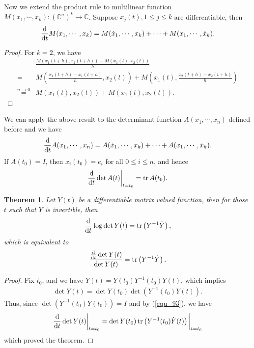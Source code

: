 \documentclass[10pt]{book}
\newtheorem{theorem}{Theorem}[chapter]
\theoremstyle{definition}
\numberwithin{equation}{chapter}
\begin{document}
Now we extend the product rule to multilinear function $M(x_1,\cdots, x_k): \left(\mathbb{C}^n\right)^k \to \mathbb{C}$. Suppose $x_j(t), 1\leq j \leq k$ are differentiable, then 
\begin{align}
    \dv{}{t}M(x_1,\cdots, x_k) = M(\dot{x}_1,\cdots, x_k) + \cdots + M(x_1,\cdots, \dot{x}_k).
\end{align}
\begin{proof}
For $k=2$, we have
\begin{align*}
    & \frac{M(x_1(t+h), x_2(t+h)) - M(x_1(t), x_2(t))}{h} \\
    = & M\left(\frac{x_1(t+h)-x_1(t+h)}{h}, x_2(t)\right) + M\left(x_1(t),\frac{x_2(t+h)-x_2(t+h)}{h} \right) \\
    \overset{n\to 0}{=} & M(\dot{x}_1(t), x_2(t)) + M(x_1(t), \dot{x}_2(t)).
\end{align*}
\end{proof}

We can apply the above result to the determinant function $A(x_1,\cdots,x_n)$ defined before and we have
\begin{align}
    \dv{}{t}A(x_1,\cdots,x_n) = A(\dot{x}_1,\cdots, x_k) + \cdots + A(x_1,\cdots, \dot{x}_k).
\end{align}
If $A(t_0) = I$, then $x_i(t_0) = e_i$ for all $0 \leq i \leq n$, and hence
\begin{align}\label{equ_93}
    \dv{}{t} \det A(t)\bigg|_{t=t_0} = \tr \dot{A}(t_0).
\end{align}

\medskip

\begin{theorem}\label{trace_determinant}
Let $Y(t)$ be a differentiable matrix valued function, then for those $t$ such that $Y$ is invertible, then
\begin{align*}
    \dv{}{t} \log \det Y(t) = \tr \left(Y^{-1} \dot{Y}\right),
\end{align*}
which is equivalent to 
\begin{align*}
    \frac{\dv{}{t}\det Y(t)}{\det Y(t)} = \tr \left(Y^{-1} \dot{Y}\right).
\end{align*}
\end{theorem}
\begin{proof}
Fix $t_0$, and we have $Y(t) = Y(t_0) Y^{-1}(t_0) Y(t)$, which implies
\begin{align*}
    \det Y(t) = \det Y(t_0) \det (Y^{-1}(t_0) Y(t)).
\end{align*}
Thus, since $\det (Y^{-1}(t_0) Y(t_0)) = I$ and by (\ref{equ_93}), we have
\begin{align*}
    \dv{}{t}\det Y(t)\bigg|_{t=t_0} = \det Y(t_0) \tr \left(Y^{-1}(t_0) \dot{Y}(t) \right)\bigg|_{t=t_0}
\end{align*}
which proved the theorem.
\end{proof}
\end{document}
